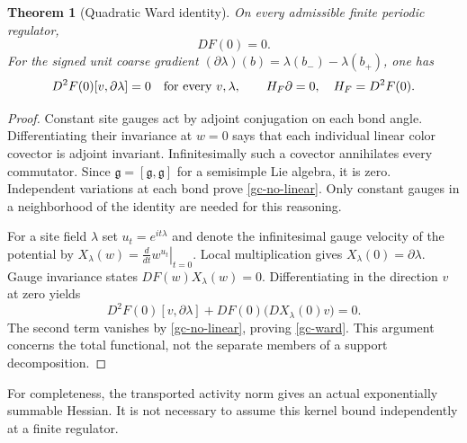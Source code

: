 \documentclass[11pt]{article}
\newtheorem{theorem}{Theorem}[section]
\theoremstyle{remark}
\begin{document}
\begin{theorem}[Quadratic Ward identity]\label{gc-ward-theorem}
On every admissible finite periodic regulator,
\begin{equation}\label{gc-no-linear}
 DF(0)=0.
\end{equation}
For the signed unit coarse gradient
$(\partial\lambda)(b)=\lambda(b_-)-\lambda(b_+)$, one has
\begin{equation}\label{gc-ward}
 D^2F(0)[v,\partial\lambda]=0
 \quad\hbox{for every }v,\lambda,
 \qquad H_F\partial=0,\quad H_F=D^2F(0).
\end{equation}
\end{theorem}
\begin{proof}
Constant site gauges act by adjoint conjugation on each bond
angle. Differentiating their invariance at $w=0$ says that each
individual linear color covector is adjoint invariant.
Infinitesimally such a covector annihilates every commutator.
Since $\mathfrak g=[\mathfrak g,\mathfrak g]$ for a semisimple
Lie algebra, it is zero. Independent variations at each bond
prove \eqref{gc-no-linear}. Only constant gauges in a neighborhood
of the identity are needed for this reasoning.

For a site field $\lambda$ set $u_t=e^{it\lambda}$ and denote
the infinitesimal gauge velocity of the potential by
$X_\lambda(w)=\left.\frac{d}{dt}w^{u_t}\right|_{t=0}$.
Local multiplication gives $X_\lambda(0)=\partial\lambda$.
Gauge invariance states $DF(w)X_\lambda(w)=0$.
Differentiating in the direction $v$ at zero yields
\[
 D^2F(0)[v,\partial\lambda]
          +DF(0)\bigl(DX_\lambda(0)v\bigr)=0.
\]
The second term vanishes by \eqref{gc-no-linear}, proving
\eqref{gc-ward}. This argument concerns the total functional,
not the separate members of a support decomposition.
\end{proof}

For completeness, the transported activity norm gives an actual
exponentially summable Hessian. It is not necessary to assume this
kernel bound independently at a finite regulator.
\end{document}
